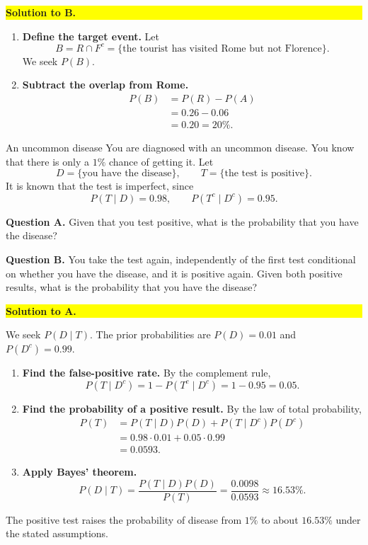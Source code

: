 \documentclass[a4paper,12pt,oneside]{report}
\newcommand{\solutionheading}[1]{%
  \par\Needspace{5\baselineskip}\noindent
  \begingroup\setlength{\fboxsep}{1pt}%
  \colorbox{yellow}{\strut\textbf{#1}}\endgroup\par\nobreak}
\begin{document}
\solutionheading{Solution to B.}
\begin{enumerate}[label=\textbf{Step \arabic*:},leftmargin=*]
  \item \textbf{Define the target event.} Let
  \[
    B=R\cap F^c
      =\{\text{the tourist has visited Rome but not Florence}\}.
  \]
  We seek $P(B)$.
  \item \textbf{Subtract the overlap from Rome.}
  \begin{align*}
    P(B)
      &=P(R)-P(A)\\
      &=0.26-0.06\\
      &=\boxed{0.20=20\%}.
  \end{align*}
\end{enumerate}
\begin{framedexercise}{An uncommon disease}
You are diagnosed with an uncommon disease. You know that there is only
a $1\%$ chance of getting it. Let
\[
  D=\{\text{you have the disease}\},\qquad
  T=\{\text{the test is positive}\}.
\]
It is known that the test is imperfect, since
\[
  P(T\mid D)=0.98,\qquad P(T^c\mid D^c)=0.95.
\]

\textbf{Question A.} Given that you test positive, what is the
probability that you have the disease?

\textbf{Question B.} You take the test again, independently of the
first test conditional on whether you have the disease, and it is
positive again. Given both positive results, what is the probability
that you have the disease?
\end{framedexercise}

\solutionheading{Solution to A.}
We seek $P(D\mid T)$. The prior probabilities are $P(D)=0.01$ and
$P(D^c)=0.99$.
\begin{enumerate}[label=\textbf{Step \arabic*:},leftmargin=*]
  \item \textbf{Find the false-positive rate.} By the complement rule,
  \[
    P(T\mid D^c)=1-P(T^c\mid D^c)=1-0.95=0.05.
  \]
  \item \textbf{Find the probability of a positive result.} By the law
  of total probability,
  \begin{align*}
    P(T)
      &=P(T\mid D)P(D)+P(T\mid D^c)P(D^c)\\
      &=0.98\cdot0.01+0.05\cdot0.99\\
      &=0.0593.
  \end{align*}
  \item \textbf{Apply Bayes' theorem.}
  \[
    \boxed{P(D\mid T)
      =\frac{P(T\mid D)P(D)}{P(T)}
      =\frac{0.0098}{0.0593}
      \approx 16.53\%.}
  \]
\end{enumerate}
The positive test raises the probability of disease from $1\%$ to about
$16.53\%$ under the stated assumptions.
\end{document}
